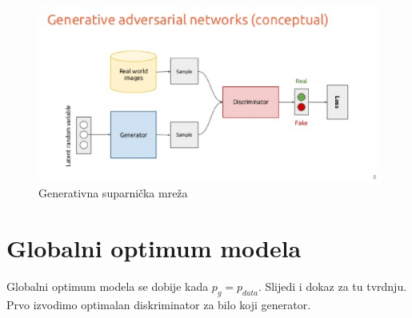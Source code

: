 \documentclass[times, utf8, diplomski]{fer}
\begin{document}
\begin{figure}[htbp]
    \centering
    \includegraphics[scale=0.7]{Slike/gan}
    \caption{Generativna suparnička mreža \cite{gansketch}}
\end{figure}

\pagebreak

\section{Globalni optimum modela}
Globalni optimum modela se dobije kada $p_g = p_{data}$. Slijedi i dokaz za tu tvrdnju. Prvo izvodimo optimalan diskriminator za bilo koji generator.
\end{document}
